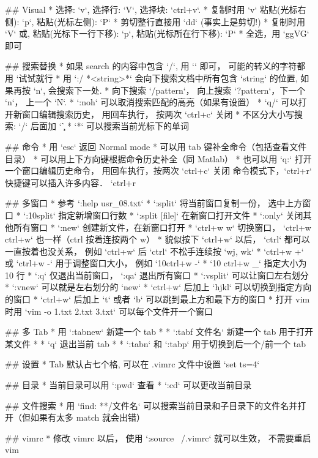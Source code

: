 ## Visual
* 选择: `v`, 选择行: `V`, 选择块: `ctrl+v`.
* 复制时用 `v` 粘贴(光标右侧): `p`, 粘贴(光标左侧): `P`
* 剪切整行直接用 `dd` (事实上是剪切!)
* 复制时用 `V` 或, 粘贴(光标下一行下移): `p`, 粘贴(光标所在行下移): `P`
* 全选，用 `ggVG` 即可

## 搜索替换
* 如果 search 的内容中包含 `/`, 用 `\/` 即可， 可能的转义的字符都用 `\` 试试就行
* 用 `:/ *<string>*` 会向下搜索文档中所有包含 `string` 的位置, 如果再按 `n`, 会搜索下一处. 
* 向下搜索 `/pattern`， 向上搜索 `?pattern`，下一个 `n`， 上一个 `N`.
* `:noh` 可以取消搜索匹配的高亮（如果有设置）
* `q/` 可以打开新窗口编辑搜索历史， 用回车执行， 按两次 `ctrl+c` 关闭
* 不区分大小写搜索:  `/` 后面加 `\c`
* `*` 可以搜索当前光标下的单词

## 命令
* 用 `esc` 返回 Normal mode
* 可以用 tab 键补全命令（包括查看文件目录）
* 可以用上下方向键根据命令历史补全（同 Matlab）
* 也可以用 `q:` 打开一个窗口编辑历史命令， 用回车执行，按两次 `ctrl+c` 关闭
命令模式下，`ctrl+r` 快捷键可以插入许多内容． `ctrl+r %

## 多窗口
* 参考 `:help usr_08.txt`
* `:split` 将当前窗口复制一份， 选中上方窗口
* `:10split` 指定新增窗口行数
* `:split [file]` 在新窗口打开文件
* `:only` 关闭其他所有窗口
* `:new` 创建新文件，在新窗口打开
* `ctrl+w w` 切换窗口， `ctrl+w ctrl+w` 也一样（ctrl 按着连按两个 w）
* 貌似按下 `ctrl+w` 以后， `ctrl` 都可以一直按着也没关系， 例如 `ctrl+w` 后 `ctrl` 不松手连续按 `wj, wk`
* `ctrl+w +` 或 `ctrl+w -` 用于调整窗口大小， 例如 `10ctrl+w -`
* `10 ctrl+w _` 指定大小为 10 行
* `:q` 仅退出当前窗口， `:qa` 退出所有窗口
* `:vsplit` 可以让窗口左右划分
* `:vnew` 可以就是左右划分的 `new`
* `ctrl+w` 后加上 `hjkl` 可以切换到指定方向的窗口
* `ctrl+w` 后加上 `t` 或者 `b` 可以跳到最上方和最下方的窗口
* 打开 vim 时用 `vim -o 1.txt 2.txt 3.txt` 可以每个文件开一个窗口

## 多 Tab
* 用 `:tabnew` 新建一个 tab
* * `:tabf 文件名` 新建一个 tab 用于打开某文件
* * `q` 退出当前 tab
* * `:tabn` 和 `:tabp` 用于切换到后一个/前一个 tab

## 设置
* Tab 默认占七个格, 可以在 .vimrc 文件中设置 `set ts=4`

## 目录
* 当前目录可以用 `:pwd` 查看
* `:cd` 可以更改当前目录

## 文件搜索
* 用 `find: **/文件名` 可以搜索当前目录和子目录下的文件名并打开（但如果有太多 match 就会出错）

## vimrc
* 修改 vimrc 以后， 使用 `:source ~/.vimrc` 就可以生效， 不需要重启 vim

